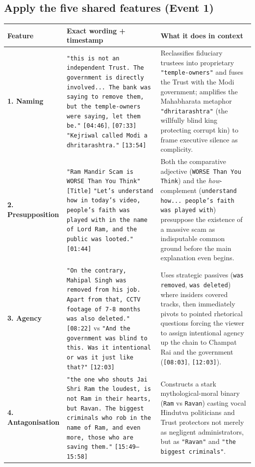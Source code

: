\documentclass[10pt,a4paper]{article}
\begin{document}
\subsection*{Apply the five shared features (Event 1)}
\begin{longtable}{@{}>{\raggedright\arraybackslash}p{} >{\raggedright\arraybackslash}p{} >{\raggedright\arraybackslash}p{}@{}}
\toprule
\textbf{Feature} & \textbf{Exact wording + timestamp} & \textbf{What it does in context} \\
\midrule
\endhead
\textbf{1. Naming} & \texttt{"this is not an independent Trust. The government is directly involved... The bank was saying to remove them, but the temple-owners were saying, let them be."} \texttt{[04:46]}, \texttt{[07:33]} \newline  \texttt{"Kejriwal called Modi a dhritarashtra."} \texttt{[13:54]} & Reclassifies fiduciary trustees into proprietary \texttt{"temple-owners"} and fuses the Trust with the Modi government; amplifies the Mahabharata metaphor \texttt{"dhritarashtra"} (the willfully blind king protecting corrupt kin) to frame executive silence as complicity. \\
\addlinespace[4pt]
\textbf{2. Presupposition} & \texttt{"Ram Mandir Scam is WORSE Than You Think"} \texttt{[Title]} \newline  \texttt{"Let's understand how in today's video, people's faith was played with in the name of Lord Ram, and the public was looted."} \texttt{[01:44]} & Both the comparative adjective (\texttt{WORSE Than You Think}) and the \textit{how}-complement (\texttt{understand how... people's faith was played with}) presuppose the existence of a massive scam as indisputable common ground before the main explanation even begins. \\
\addlinespace[4pt]
\textbf{3. Agency} & \texttt{"On the contrary, Mahipal Singh was removed from his job. Apart from that, CCTV footage of 7-8 months was also deleted."} \texttt{[08:22]} vs \texttt{"And the government was blind to this. Was it intentional or was it just like that?"} \texttt{[12:03]} & Uses strategic passives (\texttt{was removed}, \texttt{was deleted}) where insiders covered tracks, then immediately pivots to pointed rhetorical questions forcing the viewer to assign intentional agency up the chain to Champat Rai and the government (\texttt{[08:03]}, \texttt{[12:03]}). \\
\addlinespace[4pt]
\textbf{4. Antagonisation} & \texttt{"the one who shouts Jai Shri Ram the loudest, is not Ram in their hearts, but Ravan. The biggest criminals who rob in the name of Ram, and even more, those who are saving them."} \texttt{[15:49--15:58]} & Constructs a stark mythological-moral binary (\texttt{Ram} vs \texttt{Ravan}) casting vocal Hindutva politicians and Trust protectors not merely as negligent administrators, but as \texttt{"Ravan"} and \texttt{"the biggest criminals"}. \\

\end{longtable}
\end{document}
